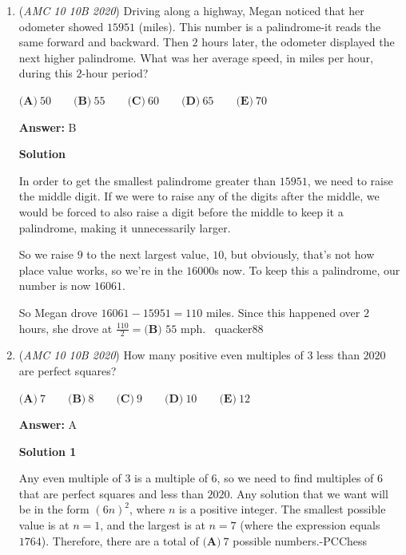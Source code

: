\begin{enumerate}
	\item (\textit{AMC 10 10B 2020}) Driving along a highway, Megan noticed that her odometer showed $15951$ (miles). This number is a palindrome-it reads the same forward and backward. Then $2$ hours later, the odometer displayed the next higher palindrome. What was her average speed, in miles per hour, during this $2$-hour period?


 $\textbf{(A)}\ 50 \qquad\textbf{(B)}\ 55 \qquad\textbf{(C)}\ 60 \qquad\textbf{(D)}\ 65 \qquad\textbf{(E)}\ 70$

 \textbf{Answer: }B



\textbf{Solution}

In order to get the smallest palindrome greater than $15951$, we need to raise the middle digit. If we were to raise any of the digits after the middle, we would be forced to also raise a digit before the middle to keep it a palindrome, making it unnecessarily larger.

 So we raise $9$ to the next largest value, $10$, but obviously, that's not how place value works, so we're in the $16000$s now. To keep this a palindrome, our number is now $16061$. 

 So Megan drove $16061-15951=110$ miles. Since this happened over $2$ hours, she drove at $\frac{110}{2}=\boxed{\textbf{(B) }55}$ mph. ~quacker88

 


 


 


	\item (\textit{AMC 10 10B 2020}) How many positive even multiples of $3$ less than $2020$ are perfect squares?


 $\textbf{(A)}\ 7 \qquad\textbf{(B)}\ 8 \qquad\textbf{(C)}\  9 \qquad\textbf{(D)}\ 10 \qquad\textbf{(E)}\ 12$

 \textbf{Answer: }A



\textbf{Solution 1}

Any even multiple of $3$ is a multiple of $6$, so we need to find multiples of $6$ that are perfect squares and less than $2020$. Any solution that we want will be in the form $(6n)^2$, where $n$ is a positive integer. The smallest possible value is at $n=1$, and the largest is at $n=7$ (where the expression equals $1764$). Therefore, there are a total of $\boxed{\textbf{(A)}\ 7}$ possible numbers.-PCChess

 




\end{enumerate}
